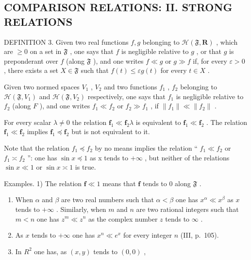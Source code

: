 \subsection{COMPARISON RELATIONS: II. STRONG RELATIONS}

DEFINITION 3. Given two real functions \(f, g\) belonging to \(\mathcal{H}(\mathfrak{F}, \mathbf{R})\) , which are \(\geqslant 0\) on a set in \(\mathfrak{F}\) , one says that \(f\) is negligible relative to \(g\) , or that \(g\) is preponderant over \(f\) (along \(\mathfrak{F}\) ), and one writes \(f \ll g\) or \(g \gg f\) if, for every \(\varepsilon > 0\) , there exists a set \(X \in \mathfrak{F}\) such that \(f(t) \leqslant \varepsilon g(t)\) for every \(t \in X\) .

Given two normed spaces \(V_{1}\) , \(V_{2}\) and two functions \(f_{1}\) , \(f_{2}\) belonging to \(\mathcal{H}(\mathfrak{F}, V_{1})\) and \(\mathcal{H}(\mathfrak{F}, V_{2})\) respectively, one says that \(f_{1}\) is negligible relative to \(f_{2}\) (along \(F\) ), and one writes \(f_{1} \ll f_{2}\) or \(f_{2} \gg f_{1}\) , if \(\|f_{1}\| \ll \|f_{2}\|\) .

For every scalar \(\lambda \neq 0\) the relation \(\mathbf{f}_1 \ll \mathbf{f}_2\lambda\) is equivalent to \(\mathbf{f}_1 \ll \mathbf{f}_2\) . The relation \(\mathbf{f}_1 \ll \mathbf{f}_2\) implies \(\mathbf{f}_1 \preccurlyeq \mathbf{f}_2\) but is not equivalent to it.

Note that the relation \(f_{1} \preccurlyeq f_{2}\) by no means implies the relation `` \(f_{1} \ll f_{2}\) or \(f_{1} \asymp f_{2}\) '': one has \(\sin x \preccurlyeq 1\) as x tends to \(+\infty\) , but neither of the relations \(\sin x \ll 1\) or \(\sin x \asymp 1\) is true.

Examples. 1) The relation \(\mathbf{f} \ll 1\) means that \(\mathbf{f}\) tends to 0 along \(\mathfrak{F}\) .

\begin{enumerate}
\def\labelenumi{\arabic{enumi})}
\setcounter{enumi}{1}
\item
  When \(\alpha\) and \(\beta\) are two real numbers such that \(\alpha < \beta\) one has \(x^{\alpha} \ll x^{\beta}\) as \(x\) tends to \(+\infty\) . Similarly, when \(m\) and \(n\) are two rational integers such that \(m < n\) one has \(z^{m} \ll z^{n}\) as the complex number \(z\) tends to \(\infty\) .
\item
  As \(x\) tends to \(+\infty\) one has \(x^n \ll e^x\) for every integer \(n\) (III, p.~105).
\item
  In \(R^{2}\) one has, as \((x, y)\) tends to \((0, 0)\) ,
\end{enumerate}

